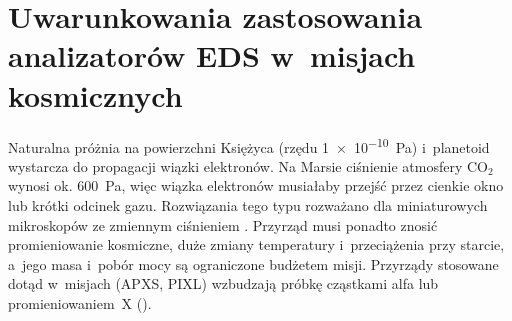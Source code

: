 \section{Uwarunkowania zastosowania analizatorów EDS w~misjach kosmicznych}
\label{sec:uzupelnienia}
\label{subsec:warunki}

Naturalna próżnia na powierzchni Księżyca (rzędu \SI{1e-10}{\pascal})
i~planetoid wystarcza do propagacji wiązki elektronów. Na Marsie ciśnienie atmosfery CO$_2$
wynosi ok. \SI{600}{\pascal}, więc wiązka elektronów musiałaby przejść
przez cienkie okno lub krótki odcinek gazu. Rozwiązania tego typu
rozważano dla miniaturowych mikroskopów ze zmiennym ciśnieniem
\cite{gaskin2012mvpsem,thaisen2010minisem}.
Przyrząd musi ponadto znosić promieniowanie kosmiczne, duże zmiany
temperatury i~przeciążenia przy starcie, a~jego masa i~pobór mocy są
ograniczone budżetem misji. Przyrządy stosowane dotąd w~misjach
(APXS, PIXL) wzbudzają próbkę cząstkami alfa lub promieniowaniem~X
().
